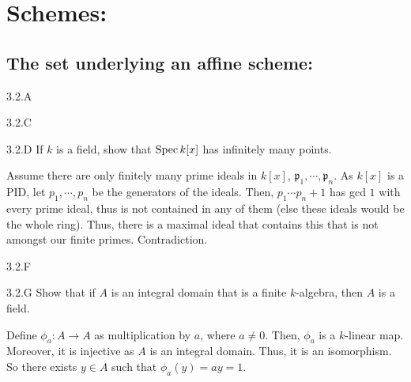 \section{Schemes: }

\subsection{The set underlying an affine scheme:}
\begin{exercise}{3.2.A}
\end{exercise}
\begin{solution}
    \todo{}
\end{solution}

\begin{exercise}{3.2.C}

\end{exercise}
\begin{solution}
    \todo{}
\end{solution}

\begin{exercise}{3.2.D}
    If $k$ is a field, show that $\operatorname{Spec} k[x]$ has infinitely many points. 
\end{exercise}
\begin{solution}
    Assume there are only finitely many prime ideals in $k[x]$, $\mathfrak p_1, \cdots, \mathfrak p_n$. As $k[x]$ is a PID, let $p_1, \cdots, p_n$ be the generators of the ideals. Then, $p_1\cdots p_n + 1$ has gcd $1$ with every prime ideal, thus is not contained in any of them (else these ideals would be the whole ring). Thus, there is a maximal ideal that contains this that is not amongst our finite primes. Contradiction. 
\end{solution}

\begin{exercise}{3.2.F}

\end{exercise}
\begin{solution}
    \todo{}
\end{solution}

\begin{exercise}{3.2.G}
    Show that if $A$ is an integral domain that is a finite $k$-algebra, then $A$ is a field. 
\end{exercise}
\begin{solution}
    Define $\phi_a: A \to A$ as multiplication by $a$, where $a \neq 0$. Then, $\phi_a$ is a $k$-linear map. Moreover, it is injective as $A$ is an integral domain. Thus, it is an isomorphism. So there exists $y \in A$ such that $\phi_a(y) = ay = 1$.
\end{solution}


